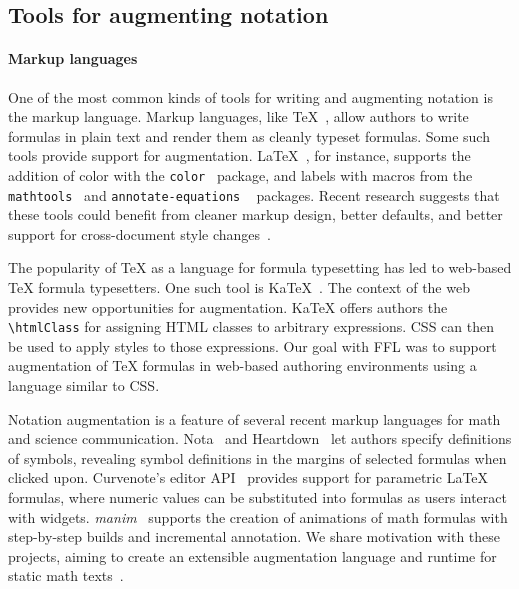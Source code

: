 \subsection{Tools for augmenting notation}


\paragraph{Markup languages}

One of the most common kinds of tools for writing and augmenting notation is the markup language. Markup languages, like TeX~\cite{ref:knuth1986tex}, allow authors to write formulas in plain text and render them as cleanly typeset formulas. Some such tools provide support for augmentation. LaTeX~\cite{tool:latex}, for instance, supports the addition of color with the \texttt{color}~\cite{tool:carlisle1997color} package, and labels with macros from the \texttt{mathtools}~\cite{tool:madsen2014mathtools} and \texttt{annotate-equations} ~\cite{tool:annotateequations} packages. Recent research suggests that these tools could benefit from cleaner markup design, better defaults, and better support for cross-document style changes~\cite{ref:head2022math}.

The popularity of TeX as a language for formula typesetting has led to web-based TeX formula typesetters. One such tool is KaTeX~\cite{tool:katex}. The context of the web provides new opportunities for augmentation. KaTeX offers authors the \texttt{\textbackslash{}htmlClass} for assigning HTML classes to arbitrary expressions. CSS can then be used to apply styles to those expressions. Our goal with FFL was to support augmentation of TeX formulas in web-based authoring environments using a language similar to CSS.

Notation augmentation is a feature of several recent markup languages for math and science communication. Nota~\cite{ref:crichton2021new} and Heartdown~\cite{ref:li2022heartdown} let authors specify definitions of symbols, revealing symbol definitions in the margins of selected formulas when clicked upon. Curvenote's editor API~\cite{tool:curvenote} provides support for parametric LaTeX formulas, where numeric values can be substituted into formulas as users interact with widgets. \emph{manim}~\cite{tool:manim} supports the creation of animations of math formulas with step-by-step builds and incremental annotation. We share motivation with these projects, aiming to create an extensible augmentation language and runtime for static math texts~\cite{ref:head2022math}.


